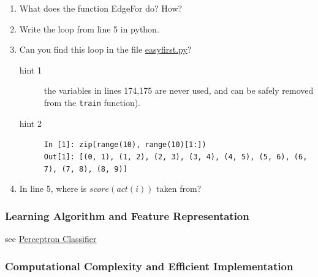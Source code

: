 \documentclass[11pt]{article}
\begin{document}
\begin{enumerate}
\item What does the function EdgeFor do? How?
\item Write the loop from line 5 in python.
\item Can you find this loop in the file \hyperref[sec-9-1]{easyfirst.py}? 
\begin{description}
\item[hint 1] the variables in lines 174,175 are never used, and can
               be safely removed from the \texttt{train} function).\\
\item[hint 2] \texttt{In [1]: zip(range(10), range(10)[1:])} \\ 
\texttt{Out[1]: [(0, 1), (1, 2), (2, 3), (3, 4), (4, 5), (5, 6), (6, 7), (7, 8), (8, 9)]}
\end{description}
\item In line 5, where is $score(act(i))$ taken from?
\end{enumerate}
\subsubsection{Learning Algorithm and Feature Representation}
\label{sec-7-2-3}

    see \hyperref[sec-7-2-5]{Perceptron Classifier}
    
\subsubsection{Computational Complexity and Efficient Implementation}
\label{sec-7-2-4}
\end{document}
